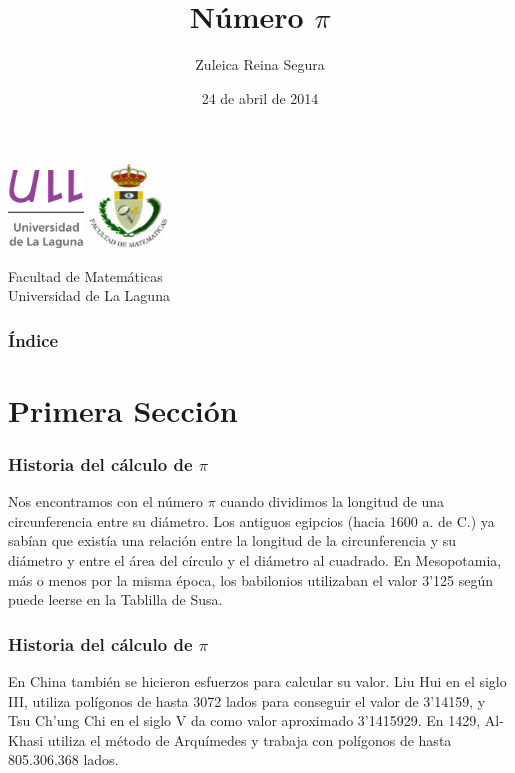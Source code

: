 \documentclass{beamer}
\title[Num $\pi$]{Número $\pi$}
\author[Zuleica Reina Segura]{Zuleica Reina Segura}
\date[24-04-2014]{24 de abril de 2014}
\begin{document}
\begin{frame}

  \includegraphics[width=0.15\textwidth]{img/ullesc.eps}
  \hspace*{7.5cm}
  \includegraphics[width=0.16\textwidth]{img/fmatesc.eps}
  \titlepage

  \begin{scriptsize}
    \begin{center}
     Facultad de Matemáticas \\
     Universidad de La Laguna
    \end{center}
  \end{scriptsize}

\end{frame}


\begin{frame}
  \frametitle{Índice}  
  \tableofcontents[pausesections]
\end{frame}
 
\section{Primera Sección}


\begin{frame}
\frametitle{Historia del cálculo de $\pi$}
Nos encontramos con el número $\pi$ cuando dividimos
la longitud de una circunferencia entre su diámetro.
Los antiguos egipcios (hacia 1600 a. de C.) ya sabían 
que existía una relación entre la longitud de la circunferencia 
y su diámetro y entre el área del círculo y el diámetro al cuadrado.
En Mesopotamia, más o menos por la misma época, los babilonios utilizaban
el valor 3'125 según puede leerse en la Tablilla de Susa. 
\end{frame}

\begin{frame}
\frametitle{Historia del cálculo de $\pi$}
En China también se hicieron esfuerzos para calcular su valor.
Liu Hui en el siglo III, utiliza polígonos de hasta 3072 lados
para conseguir el valor de 3'14159, y Tsu Ch'ung Chi en el siglo V 
da como valor aproximado 3'1415929.
En 1429, Al-Khasi utiliza el método de Arquímedes y trabaja 
con polígonos de hasta 805.306.368 lados.
\end{frame}
\end{document}
